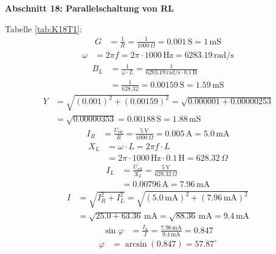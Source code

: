 \large \textbf{Abschnitt 18: Parallelschaltung von RL}

Tabelle \ref{tab:K18T1}:
\begin{align*}
    G &= \frac{1}{R} = \frac{1}{1000 \, \Omega} = 0.001 \, \mathrm{S} = 1 \, \mathrm{mS}
\end{align*}
\begin{align*}
    \omega &= 2 \pi f = 2 \pi \cdot 1000 \, \mathrm{Hz} = 6283.19 \, \mathrm{rad/s}
\end{align*}
\begin{align*}
    B_L &= \frac{1}{\omega \cdot L} = \frac{1}{6283.19 \, \mathrm{rad/s} \cdot 0.1 \, \mathrm{H}} \\
    &= \frac{1}{628.32} = 0.00159 \, \mathrm{S} = 1.59 \, \mathrm{mS}
\end{align*}
\begin{align*}
    Y &= \sqrt{(0.001)^2 + (0.00159)^2} = \sqrt{0.000001 + 0.00000253} \\
    &= \sqrt{0.00000353} = 0.00188 \, \mathrm{S} =1.88 \, \mathrm{mS}
\end{align*}
\begin{align*}
    I_R &= \frac{U_\mathrm{eff}}{R} = \frac{5 \, \mathrm{V}}{1000 \, \Omega} = 0.005 \, \mathrm{A} = 5.0 \, \mathrm{mA}
\end{align*}
\begin{align*}
    X_L &= \omega \cdot L = 2 \pi f \cdot L \\
    &= 2 \pi \cdot 1000 \, \mathrm{Hz} \cdot 0.1 \, \mathrm{H} = 628.32 \, \Omega
\end{align*}
\begin{align*}
    I_L &= \frac{U_\mathrm{eff}}{X_L} = \frac{5 \, \mathrm{V}}{628.32 \, \Omega} \\
    &= 0.00796 \, \mathrm{A} = 7.96 \, \mathrm{mA}
\end{align*}
\begin{align*}
    I &= \sqrt{I_R^2 + I_L^2} = \sqrt{(5.0 \, \mathrm{mA})^2 + (7.96 \, \mathrm{mA})^2} \\
    &= \sqrt{25.0 + 63.36} \, \mathrm{mA} = \sqrt{88.36} \, \mathrm{mA} = 9.4 \, \mathrm{mA}
\end{align*}
\begin{align*}
    \sin \varphi &= \frac{I_L}{I} = \frac{7.96 \, \mathrm{mA}}{9.4 \, \mathrm{mA}} = 0.847
\end{align*}
\begin{align*}
    \varphi &= \arcsin(0.847) = 57.87^\circ
\end{align*}


